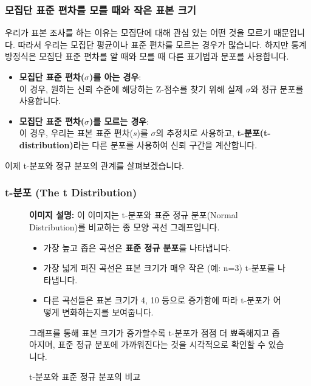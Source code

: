 \documentclass[11pt,a4paper]{article}
\begin{document}
\subsubsection*{모집단 표준 편차를 모를 때와 작은 표본 크기}
우리가 표본 조사를 하는 이유는 모집단에 대해 관심 있는 어떤 것을 모르기 때문입니다. 따라서 우리는 모집단 평균이나 표준 편차를 모르는 경우가 많습니다. 하지만 통계 방정식은 모집단 표준 편차를 알 때와 모를 때 다른 표기법과 분포를 사용합니다.

\begin{itemize}
    \item \textbf{모집단 표준 편차($\sigma$)를 아는 경우}:
    \begin{equation*}
        [\bar{x} \pm Z_{\alpha/2} \frac{\sigma}{\sqrt{n}}]
    \end{equation*}
    이 경우, 원하는 신뢰 수준에 해당하는 Z-점수를 찾기 위해 실제 $\sigma$와 정규 분포를 사용합니다.
    \item \textbf{모집단 표준 편차($\sigma$)를 모르는 경우}:
    \begin{equation*}
        [\bar{x} \pm t_{\alpha/2} \frac{s}{\sqrt{n}}]
    \end{equation*}
    이 경우, 우리는 표본 표준 편차($s$)를 $\sigma$의 추정치로 사용하고, \textbf{t-분포(t-distribution)}라는 다른 분포를 사용하여 신뢰 구간을 계산합니다.
\end{itemize}
이제 t-분포와 정규 분포의 관계를 살펴보겠습니다.

\subsubsection*{t-분포 (The t Distribution)}

\begin{figure}[h!]
  \centering
  \begin{tcolorbox}[colback=gray!10, colframe=gray!50, title=\textbf{t-분포와 정규 분포 비교 (이미지 설명)}, sharp corners]
    \textbf{이미지 설명:} 이 이미지는 t-분포와 표준 정규 분포(Normal Distribution)를 비교하는 종 모양 곡선 그래프입니다.
    \begin{itemize}
        \item 가장 높고 좁은 곡선은 \textbf{표준 정규 분포}를 나타냅니다.
        \item 가장 넓게 퍼진 곡선은 표본 크기가 매우 작은 (예: n=3) t-분포를 나타냅니다.
        \item 다른 곡선들은 표본 크기가 4, 10 등으로 증가함에 따라 t-분포가 어떻게 변화하는지를 보여줍니다.
    \end{itemize}
    그래프를 통해 표본 크기가 증가할수록 t-분포가 점점 더 뾰족해지고 좁아지며, 표준 정규 분포에 가까워진다는 것을 시각적으로 확인할 수 있습니다.
  \end{tcolorbox}
  \caption{t-분포와 표준 정규 분포의 비교}
  \label{fig:t_distribution}
\end{figure}
\end{document}
